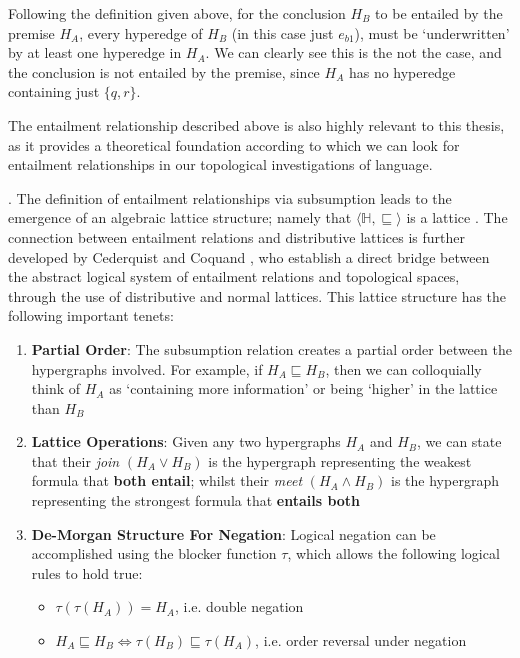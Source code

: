 \documentclass[12pt,twoside]{report}
\begin{document}
Following the definition given above, for the conclusion $H_B$ to be entailed by the premise $H_A$, every hyperedge of $H_B$ (in this case just $e_{b1}$), must be `underwritten' by at least one hyperedge in $H_A$. We can clearly see this is the not the case, and the conclusion is not entailed by the premise, since $H_A$ has no hyperedge containing just $\{q, r\}$. \newline

The entailment relationship described above is also highly relevant to this thesis, as it provides a theoretical foundation according to which we can look for entailment relationships in our topological investigations of language. \newline \par

. The definition of entailment relationships via subsumption leads to the emergence of an algebraic lattice structure; namely that $\langle\mathbb{H}, \sqsubseteq\rangle$ is a lattice \cite{leibnizianAnalysis}. The connection between entailment relations and distributive lattices is further developed by Cederquist and Coquand \cite{Cederquist}, who establish a direct bridge between the abstract logical system of entailment relations and topological spaces, through the use of distributive and normal lattices. This lattice structure has the following important tenets:
\begin{enumerate}
    \item \textbf{Partial Order}: The subsumption relation creates a partial order between the hypergraphs involved. For example, if $H_A \sqsubseteq H_B$, then we can colloquially think of $H_A$ as `containing more information' or being `higher' in the lattice than $H_B$
    \item \textbf{Lattice Operations}: Given any two hypergraphs $H_A$ and $H_B$, we can state that their \textit{join} $(H_A \lor H_B)$ is the hypergraph representing the weakest formula that \textbf{both entail}; whilst their \textit{meet} $(H_A \land H_B)$ is the hypergraph representing the strongest formula that \textbf{entails both}
    \item \textbf{De-Morgan Structure For Negation}: Logical negation can be accomplished using the blocker function $\tau$, which allows the following logical rules to hold true:
    \begin{itemize}
        \item $\tau(\tau(H_A)) = H_A$, i.e. double negation
        \item $H_A \sqsubseteq H_B \iff \tau(H_B) \sqsubseteq \tau(H_A)$, i.e. order reversal under negation
    \end{itemize}
\end{enumerate}
\end{document}
